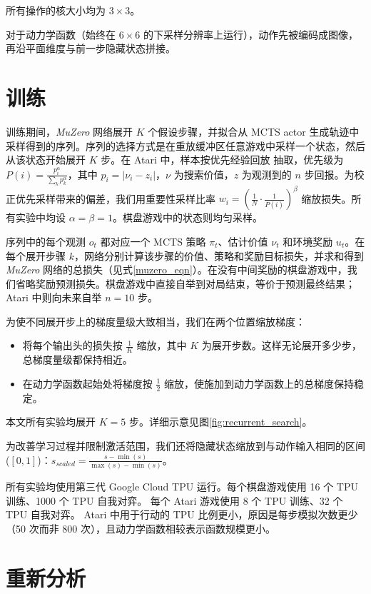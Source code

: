\documentclass{article}
\newcommand{\muzero}{\emph{MuZero}}
\begin{document}
\begin{appendices}
所有操作的核大小均为 $3 \times 3$。

对于动力学函数（始终在 $6 \times 6$ 的下采样分辨率上运行），动作先被编码成图像，再沿平面维度与前一步隐藏状态拼接。


\section{训练}

训练期间，\muzero{} 网络展开 $K$ 个假设步骤，并拟合从 MCTS actor 生成轨迹中采样得到的序列。序列的选择方式是在重放缓冲区任意游戏中采样一个状态，然后从该状态开始展开 $K$ 步。在 Atari 中，样本按优先经验回放\cite{Schaul2016} 抽取，优先级为 $P(i) = \frac{p_i^\alpha}{\sum_k{p_k^\alpha}}$，其中 $p_i = |\nu_i - z_i|$，$\nu$ 为搜索价值，$z$ 为观测到的 $n$ 步回报。为校正优先采样带来的偏差，我们用重要性采样比率 $w_i = (\frac{1}{N} \cdot \frac{1}{P(i)})^\beta$ 缩放损失。所有实验中均设 $\alpha = \beta = 1$。棋盘游戏中的状态则均匀采样。

序列中的每个观测 $o_t$ 都对应一个 MCTS 策略 $\pi_t$、估计价值 $\nu_t$ 和环境奖励 $u_t$。在每个展开步骤 $k$，网络分别计算该步骤的价值、策略和奖励目标损失，并求和得到 \muzero{} 网络的总损失（见式\ref{muzero_eqn}）。在没有中间奖励的棋盘游戏中，我们省略奖励预测损失。棋盘游戏中直接自举到对局结束，等价于预测最终结果；Atari 中则向未来自举 $n=10$ 步。

为使不同展开步上的梯度量级大致相当，我们在两个位置缩放梯度：

\begin{itemize}
\item 将每个输出头的损失按 $\frac{1}{K}$ 缩放，其中 $K$ 为展开步数。这样无论展开多少步，总梯度量级都保持相近。
\item 在动力学函数起始处将梯度按 $\frac{1}{2}$ 缩放，使施加到动力学函数上的总梯度保持稳定。
\end{itemize}

本文所有实验均展开 $K=5$ 步。详细示意见图\ref{fig:recurrent_search}。

为改善学习过程并限制激活范围，我们还将隐藏状态缩放到与动作输入相同的区间($[0, 1]$)：$s_{scaled} = \frac{s - \min(s)}{\max(s) - \min(s)}$。

所有实验均使用第三代 Google Cloud TPU 运行\cite{tpuv3}。每个棋盘游戏使用 16 个 TPU 训练、1000 个 TPU 自我对弈。%
每个 Atari 游戏使用 8 个 TPU 训练、32 个 TPU 自我对弈。%
Atari 中用于行动的 TPU 比例更小，原因是每步模拟次数更少（50 次而非 800 次），且动力学函数相较表示函数规模更小。


\section{重新分析}
\label{reanalyze}


\end{appendices}
\end{document}
